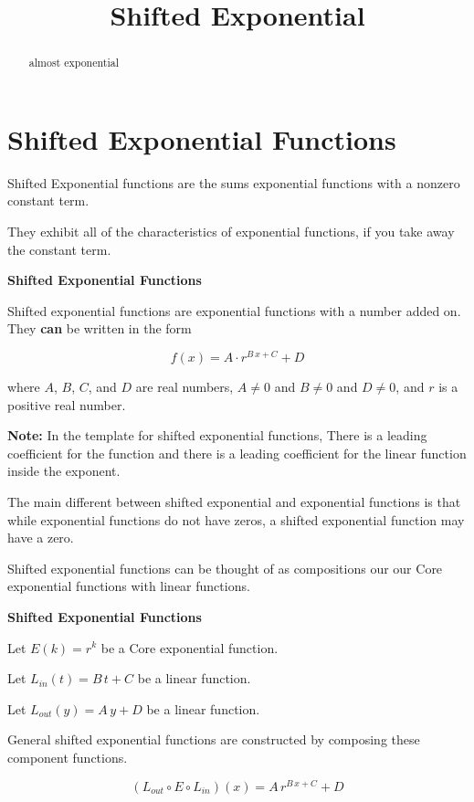 \documentclass{ximera}
\title{Shifted Exponential}
\begin{document}
\begin{abstract}
almost exponential
\end{abstract}
\maketitle





\section*{Shifted Exponential Functions}


Shifted Exponential functions are the sums exponential functions with a nonzero constant term.

They exhibit all of the characteristics of exponential functions, if you take away the constant term.


\begin{definition} \textbf{\textcolor{green!50!black}{Shifted Exponential Functions}}

Shifted exponential functions are exponential functions with a number added on.  They \textbf{\textcolor{purple!85!blue}{can}} be written in the form


\[      f(x) = A \cdot r^{B \, x + C} + D   \]

where $A$, $B$, $C$, and $D$ are real numbers, $A \ne 0$ and $B \ne 0$ and $D \ne 0$, and $r$ is a positive real number.


\end{definition}

\textbf{Note:}  In the template for shifted exponential functions, There is a leading coefficient for the function and there is a leading coefficient for the linear function inside the exponent. 


The main different between shifted exponential and exponential functions is that while exponential functions do not have zeros, a shifted exponential function may have a zero. 







Shifted exponential functions can be thought of as compositions our our Core exponential functions with linear functions.



\begin{idea} \textbf{\textcolor{blue!55!black}{Shifted Exponential Functions}}


Let $E(k) = r^k $ be a Core exponential function.

Let $L_{in}(t) = B \, t + C$ be a linear function.

Let $L_{out}(y) = A \, y + D$ be a linear function.


General shifted exponential functions are constructed by composing these component functions.


\[
(L_{out} \circ E \circ L_{in})(x) = A \, r^{B \,x + C} + D
\]




\end{idea}
\end{document}
